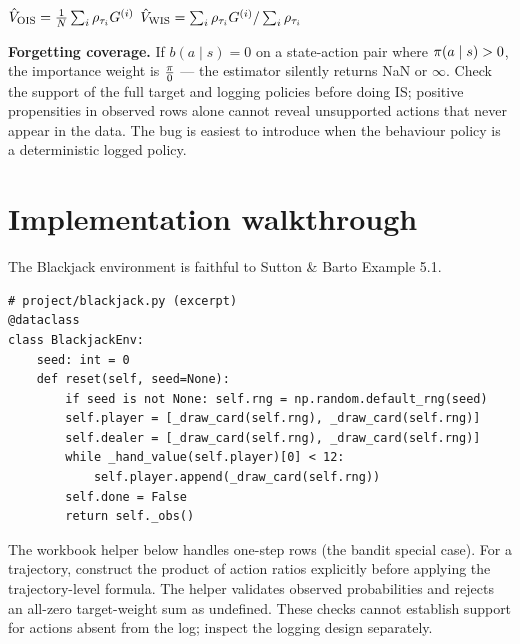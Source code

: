 \documentclass[11pt,oneside]{scrbook}
\begin{document}
\begin{algorithm}[H]
\SetAlgoLined
{}
\Return $\hat V_{\mathrm{OIS}} = \tfrac{1}{N}\sum_i \rho_{\tau_i}G^{(i)}$\;
\Return $\hat V_{\mathrm{WIS}} = \sum_i \rho_{\tau_i}G^{(i)} / \sum_i \rho_{\tau_i}$\;
\caption{Off-policy MC via importance sampling.}
\end{algorithm}

\begin{pitfall}
\textbf{Forgetting coverage.} If $b(a\mid s)=0$ on a state-action pair where
$\pi(a\mid s)>0$, the importance weight is $\frac{\pi}{0}$ --- the
estimator silently returns NaN or $\infty$. Check the support of the full target and logging policies before doing IS;
positive propensities in observed rows alone cannot reveal unsupported
actions that never appear in the data. The bug is easiest to introduce when the behaviour
policy is a deterministic logged policy.
\end{pitfall}

\chapter{Implementation walkthrough}

The Blackjack environment is faithful to Sutton \& Barto Example 5.1.

\begin{codebox}
\begin{verbatim}
# project/blackjack.py (excerpt)
@dataclass
class BlackjackEnv:
    seed: int = 0
    def reset(self, seed=None):
        if seed is not None: self.rng = np.random.default_rng(seed)
        self.player = [_draw_card(self.rng), _draw_card(self.rng)]
        self.dealer = [_draw_card(self.rng), _draw_card(self.rng)]
        while _hand_value(self.player)[0] < 12:
            self.player.append(_draw_card(self.rng))
        self.done = False
        return self._obs()
\end{verbatim}
\end{codebox}

The workbook helper below handles one-step rows (the bandit special case).
For a trajectory, construct the product of action ratios explicitly before
applying the trajectory-level formula. The helper validates observed
probabilities and rejects an all-zero target-weight sum as undefined. These
checks cannot establish support for actions absent from the log; inspect the
logging design separately.
\end{document}
